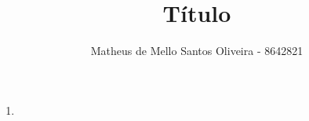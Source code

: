 \documentclass[a4paper]{article}
\title{Título} %
\author{Matheus de Mello Santos Oliveira - 8642821} %
\date{} %
\theoremstyle{style}
\theoremstyle{proof}
\begin{document}
\maketitle %


\begin{enumerate}[label=\textbf{\arabic*}.]
\item
\end{enumerate}
\end{document}
